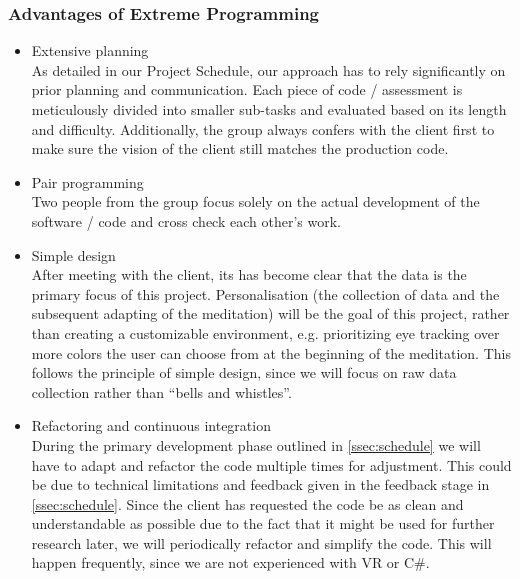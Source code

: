 \documentclass[coverpage,lineno]{../custom}
\begin{document}
\subsubsection{Advantages of Extreme Programming}
\begin{itemize}
    \item Extensive planning \\
    As detailed in our Project Schedule, our approach has to rely significantly on prior planning and communication. Each piece of code / assessment is meticulously divided into smaller sub-tasks and evaluated based on its length and difficulty. Additionally, the group always confers with the client first to make sure the vision of the client still matches the production code.
    \item Pair programming \\
    Two people from the group focus solely on the actual development of the software / code and cross check each other's work. 
    \item Simple design \\
    After meeting with the client, its has become clear that the data is the primary focus of this project. Personalisation (the collection of data and the subsequent adapting of the meditation) will be the goal of this project, rather than creating a customizable environment, e.g. prioritizing eye tracking over more colors the user can choose from at the beginning of the meditation. This follows the principle of simple design, since we will focus on raw data collection rather than ``bells and whistles''.
    \item Refactoring and continuous integration \\
     During the primary development phase outlined in \cref{ssec:schedule} we will have to adapt and refactor the code multiple times for adjustment. This could be due to technical limitations and feedback given in the feedback stage in \cref{ssec:schedule}. Since the client has requested the code be as clean and understandable as possible due to the fact that it might be used for further research later, we will periodically refactor and simplify the code. This will happen frequently, since we are not experienced with VR or C\#.
\end{itemize}
\end{document}
